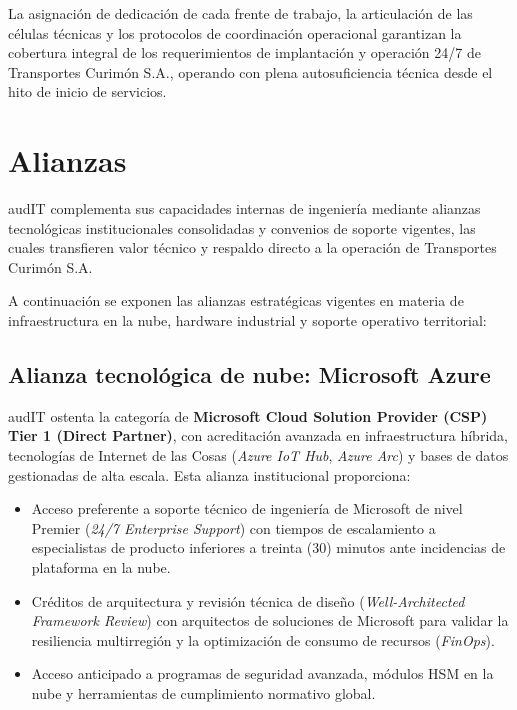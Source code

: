 La asignación de dedicación de cada frente de trabajo, la articulación de las células técnicas y los protocolos de coordinación operacional garantizan la cobertura integral de los requerimientos de implantación y operación 24/7 de Transportes Curimón S.A., operando con plena autosuficiencia técnica desde el hito de inicio de servicios.

\section{Alianzas}\label{sec:1-alianzas}

audIT complementa sus capacidades internas de ingeniería mediante alianzas tecnológicas institucionales consolidadas y convenios de soporte vigentes, las cuales transfieren valor técnico y respaldo directo a la operación de Transportes Curimón S.A.

A continuación se exponen las alianzas estratégicas vigentes en materia de infraestructura en la nube, hardware industrial y soporte operativo territorial:

\subsection{Alianza tecnológica de nube: Microsoft Azure}\label{sec:1-alianza-azure}

audIT ostenta la categoría de \textbf{Microsoft Cloud Solution Provider (CSP) Tier 1 (Direct Partner)}, con acreditación avanzada en infraestructura híbrida, tecnologías de Internet de las Cosas (\textit{Azure IoT Hub}, \textit{Azure Arc}) y bases de datos gestionadas de alta escala. Esta alianza institucional proporciona:

\begin{itemize}
  \item Acceso preferente a soporte técnico de ingeniería de Microsoft de nivel Premier (\textit{24/7 Enterprise Support}) con tiempos de escalamiento a especialistas de producto inferiores a treinta (30) minutos ante incidencias de plataforma en la nube.
  \item Créditos de arquitectura y revisión técnica de diseño (\textit{Well-Architected Framework Review}) con arquitectos de soluciones de Microsoft para validar la resiliencia multirregión y la optimización de consumo de recursos (\textit{FinOps}).
  \item Acceso anticipado a programas de seguridad avanzada, módulos HSM en la nube y herramientas de cumplimiento normativo global.
\end{itemize}

